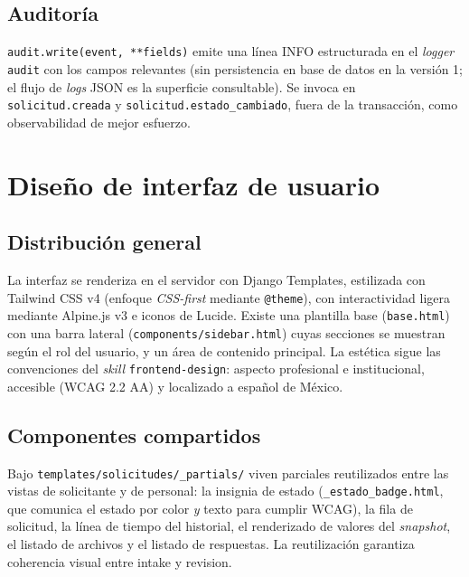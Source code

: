 \documentclass[12pt,letterpaper]{report}
\begin{document}
\section{Auditoría}

\texttt{audit.write(event, **fields)} emite una línea INFO estructurada en el
\textit{logger} \texttt{audit} con los campos relevantes (sin persistencia en
base de datos en la versión 1; el flujo de \textit{logs} JSON es la superficie
consultable). Se invoca en \texttt{solicitud.creada} y
\texttt{solicitud.estado\_cambiado}, fuera de la transacción, como observabilidad
de mejor esfuerzo.

\chapter{Diseño de interfaz de usuario}

\section{Distribución general}

La interfaz se renderiza en el servidor con Django Templates, estilizada con
Tailwind CSS v4 (enfoque \textit{CSS-first} mediante \texttt{@theme}), con
interactividad ligera mediante Alpine.js v3 e iconos de Lucide. Existe una
plantilla base (\texttt{base.html}) con una barra lateral
(\texttt{components/sidebar.html}) cuyas secciones se muestran según el rol del
usuario, y un área de contenido principal. La estética sigue las convenciones del
\textit{skill} \texttt{frontend-design}: aspecto profesional e institucional,
accesible (WCAG 2.2 AA) y localizado a español de México.

\section{Componentes compartidos}

Bajo \texttt{templates/solicitudes/\_partials/} viven parciales reutilizados
entre las vistas de solicitante y de personal: la insignia de estado
(\texttt{\_estado\_badge.html}, que comunica el estado por color \emph{y} texto
para cumplir WCAG), la fila de solicitud, la línea de tiempo del historial, el
renderizado de valores del \textit{snapshot}, el listado de archivos y el listado
de respuestas. La reutilización garantiza coherencia visual entre intake y
revision.
\end{document}
